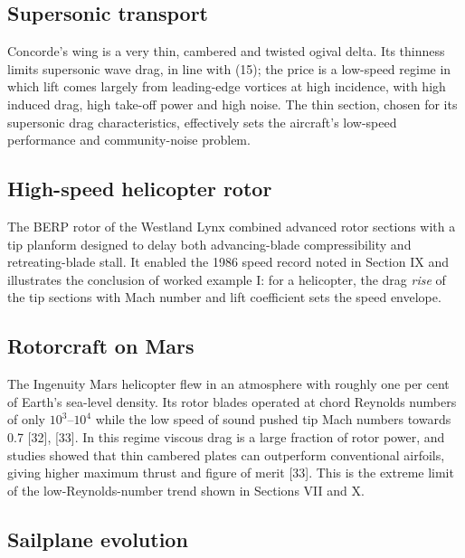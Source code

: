 \documentclass[10pt,a4paper,twocolumn]{article}
\begin{document}
\hypertarget{supersonic-transport}{%
\subsection{Supersonic transport}\label{supersonic-transport}}

Concorde's wing is a very thin, cambered and twisted ogival delta. Its
thinness limits supersonic wave drag, in line with (15); the price is a
low-speed regime in which lift comes largely from leading-edge vortices
at high incidence, with high induced drag, high take-off power and high
noise. The thin section, chosen for its supersonic drag characteristics,
effectively sets the aircraft's low-speed performance and
community-noise problem.

\hypertarget{high-speed-helicopter-rotor}{%
\subsection{High-speed helicopter
rotor}\label{high-speed-helicopter-rotor}}

The BERP rotor of the Westland Lynx combined advanced rotor sections
with a tip planform designed to delay both advancing-blade
compressibility and retreating-blade stall. It enabled the 1986 speed
record noted in Section IX and illustrates the conclusion of worked
example I: for a helicopter, the drag \emph{rise} of the tip sections
with Mach number and lift coefficient sets the speed envelope.

\hypertarget{rotorcraft-on-mars}{%
\subsection{Rotorcraft on Mars}\label{rotorcraft-on-mars}}

The Ingenuity Mars helicopter flew in an atmosphere with roughly one per
cent of Earth's sea-level density. Its rotor blades operated at chord
Reynolds numbers of only \(10^3\)--\(10^4\) while the low speed of sound
pushed tip Mach numbers towards 0.7 {[}32{]}, {[}33{]}. In this regime
viscous drag is a large fraction of rotor power, and studies showed that
thin cambered plates can outperform conventional airfoils, giving higher
maximum thrust and figure of merit {[}33{]}. This is the extreme limit
of the low-Reynolds-number trend shown in Sections VII and X.

\hypertarget{sailplane-evolution}{%
\subsection{Sailplane evolution}\label{sailplane-evolution}}
\end{document}
